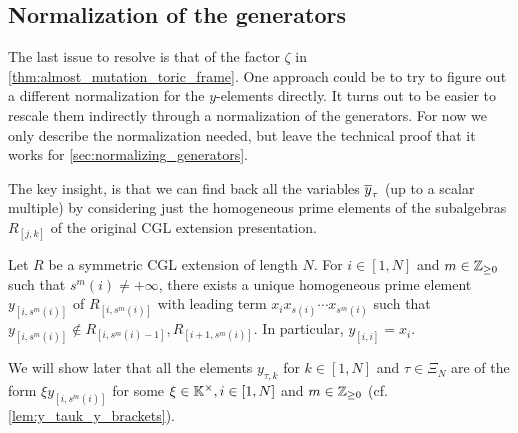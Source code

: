 \subsection{Normalization of the generators}

The last issue to resolve is that of the factor $\zeta$ in
\cref{thm:almost_mutation_toric_frame}. One approach could be to try to figure out a
different normalization for the $y$-elements directly. It turns out to be easier to
rescale them indirectly through a normalization of the generators. For now we only
describe the normalization needed, but leave the technical proof that it works for
\cref{sec:normalizing_generators}.

\medskip

The key insight, is that we can find back all the variables $\overline{y}_{\tau}$ (up to a
scalar multiple) by considering just the homogeneous prime elements of the subalgebras
$R_{[j, k]}$ of the original CGL extension presentation.

\begin{theorem}\label{thm:y_square_brackets}

	Let $R$ be a symmetric CGL extension of length $N$. For $i\in [1, N]$ and $m \in
		\mathbb{Z}_{\geq 0}$ such that $s^m(i) \neq + \infty$, there exists a unique homogeneous
	prime element $y_{[i, s^m(i)]}$ of $R_{[i, s^m(i)]}$
	with leading term $x_i x_{s(i)} \cdots x_{s^m(i)}$ such that $y_{[i, s^m(i)]} \notin
		R_{[i, s^m(i) - 1]}, R_{[i+1, s^m(i)]}$. In particular, $y_{[i, i]} = x_i$.
\end{theorem}

We will show later that all the elements $y_{\tau, k}$ for $k \in [1, N]$ and $\tau \in
	\Xi_N$ are of the form $\xi y_{[i, s^m(i)]}$ for some $\xi \in \mathbb{K}^\times, i \in [1,
		N]$ and $m \in \mathbb{Z}_{\geq 0}$ (cf. \cref{lem:y_tauk_y_brackets}).


